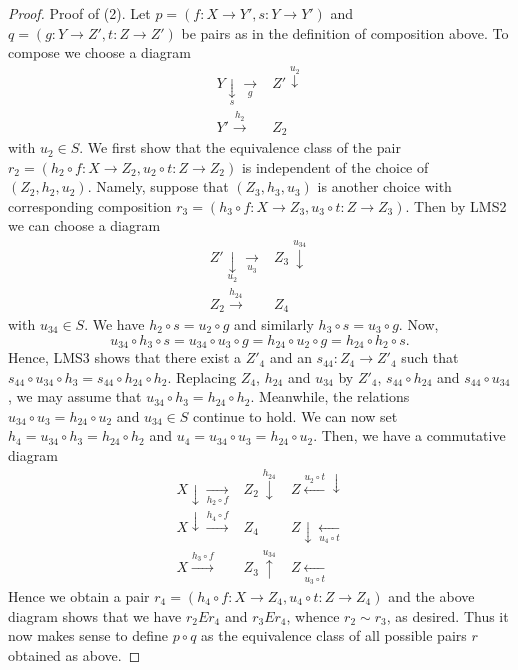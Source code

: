 \begin{proof}
\medskip\noindent
Proof of (2). Let $p = (f : X \to Y', s : Y \to Y')$ and
$q = (g : Y \to Z', t : Z \to Z')$ be pairs as in the definition of composition
above. To compose we choose a diagram
$$
\begin{array}{cc}Y \underset{s}{\downarrow}\underset{g}{\longrightarrow} & Z' \overset{u_2}{\downarrow} \\ Y' \overset{h_2}{\longrightarrow} & Z_2\end{array}
$$
with $u_2 \in S$. We first show that the equivalence class of the pair
$r_2 = (h_2 \circ f : X \to Z_2, u_2 \circ t : Z \to Z_2)$
is independent of the choice of $(Z_2, h_2, u_2)$. Namely, suppose
that $(Z_3, h_3, u_3)$ is another choice with corresponding composition
$r_3 = (h_3 \circ f : X \to Z_3, u_3 \circ t : Z \to Z_3)$.
Then by LMS2 we can choose a diagram
$$
\begin{array}{cc}Z' \underset{u_2}{\downarrow}\underset{u_3}{\longrightarrow} & Z_3 \overset{u_{34}}{\downarrow} \\ Z_2 \overset{h_{24}}{\longrightarrow} & Z_4\end{array}
$$
with $u_{34} \in S$. We have $h_2 \circ s = u_2 \circ g$
and similarly $h_3 \circ s = u_3 \circ g$. Now,
$$
u_{34} \circ h_3 \circ s
= u_{34} \circ u_3 \circ g
= h_{24} \circ u_2 \circ g
= h_{24} \circ h_2 \circ s.
$$
Hence, LMS3 shows that there
exist a $Z'_4$ and an $s_{44} : Z_4 \to Z'_4$ such that
$s_{44} \circ u_{34} \circ h_3 = s_{44} \circ h_{24} \circ h_2$.
Replacing $Z_4$, $h_{24}$ and $u_{34}$ by $Z'_4$,
$s_{44} \circ h_{24}$ and $s_{44} \circ u_{34}$, we may
assume that $u_{34} \circ h_3 = h_{24} \circ h_2$.
Meanwhile, the relations $u_{34} \circ u_3 = h_{24} \circ u_2$
and $u_{34} \in S$ continue to hold. We can now set
$h_4 = u_{34} \circ h_3 = h_{24} \circ h_2$ and
$u_4 = u_{34} \circ u_3 = h_{24} \circ u_2$. Then, we have a
commutative diagram
$$
\begin{array}{ccc}X \downarrow\underset{h_2\circ f}{\longrightarrow} & Z_2 \overset{h_{24}}{\downarrow} & Z \overset{u_2 \circ t}{\longleftarrow}\downarrow \\ X \downarrow\overset{h_4\circ f}{\longrightarrow} & Z_4 & Z \downarrow\underset{u_4 \circ t}{\longleftarrow} \\ X \overset{h_3 \circ f}{\longrightarrow} & Z_3 \overset{u_{34}}{\uparrow} & Z \underset{u_3 \circ t}{\longleftarrow}\end{array}
$$
Hence we obtain a pair
$r_4 =
(h_4 \circ f : X \to Z_4, u_4 \circ t : Z \to Z_4)$
and the above diagram shows that we have $r_2Er_4$ and
$r_3Er_4$, whence $r_2 \sim r_3$, as desired. Thus it now
makes sense to define $p \circ q$ as the equivalence class of
all possible pairs $r$ obtained as above.


\end{proof}
